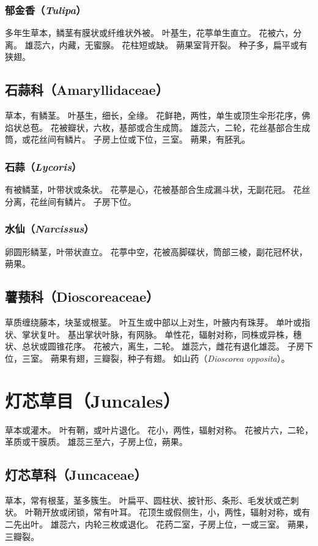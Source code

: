 \documentclass[11pt]{article}
\begin{document}
\begin{sloppypar}
\subsubsection{郁金香（\textit{Tulipa}）}
多年生草本，鳞茎有膜状或纤维状外被。
叶基生，花葶单生直立。
花被六，分离。
雄蕊六，内藏，无蜜腺。
花柱短或缺。
蒴果室背开裂。
种子多，扁平或有狭翅。

\subsection{石蒜科（Amaryllidaceae）}
草本，有鳞茎。
叶基生，细长，全缘。
花鲜艳，两性，单生或顶生伞形花序，佛焰状总苞。
花被瓣状，六枚，基部或合生成筒。
雄蕊六，二轮，花丝基部合生成筒，或花丝间有鳞片。
子房上位或下位，三室。
蒴果，有胚乳。

\subsubsection{石蒜（\textit{Lycoris}）}
有被鳞茎，叶带状或条状。
花葶是心，花被基部合生成漏斗状，无副花冠。
花丝分离，花丝间有鳞片。
子房下位。

\subsubsection{水仙（\textit{Narcissus}）}
卵圆形鳞茎，叶带状直立。
花葶中空，花被高脚碟状，筒部三棱，副花冠杯状，蒴果。

\subsection{薯蓣科（Dioscoreaceae）}
草质缠绕藤本，块茎或根茎。
叶互生或中部以上对生，叶腋内有珠芽。
单叶或指状、掌状复叶。
基出掌状叶脉，有网脉。
单性花，辐射对称，同株或异株，穗状、总状或圆锥花序。
花被六，离生，二轮。
雄蕊六，雌花有退化雄蕊。
子房下位，三室。
蒴果有翅，三瓣裂，种子有翅。
如山药（\textit{Dioscorea opposita}）。

\section{灯芯草目（Juncales）}
草本或灌木。
叶有鞘，或叶片退化。
花小，两性，辐射对称。
花被片六，二轮，革质或干膜质。
雄蕊三至六，子房上位，蒴果。

\subsection{灯芯草科（Juncaceae）}
草本，常有根茎，茎多簇生。
叶扁平、圆柱状、披针形、条形、毛发状或芒刺状。
叶鞘开放或闭锁，常有叶耳。
花顶生或假侧生，小，两性，辐射对称，或有二先出叶。
雄蕊六，内轮三枚或退化。
花药二室，子房上位，一或三室。
蒴果，三瓣裂。


\end{sloppypar}
\end{document}
